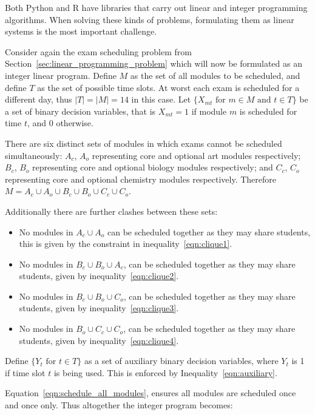 Both Python and R have libraries that carry out linear and integer
programming algorithms. When solving these kinds of problems, formulating
them as linear systems is the most important challenge.

Consider again the exam scheduling problem from
Section~\ref{sec:linear_programming_problem} which
will now be formulated as an integer linear program.
Define \(M\) as the set of all modules to be scheduled, and define \(T\) as the set
of possible time slots. At worst each exam is
scheduled for a different day, thus \(|T| = |M| = 14\) in this case.
Let \(\{X_{mt} \text{ for } m \in M \text{ and } t \in T\}\) be a set of binary
decision variables, that is \(X_{mt} = 1\) if module \(m\) is scheduled for time
\(t\), and \(0\) otherwise.

There are six distinct sets of modules in which exams cannot be scheduled
simultaneously: \(A_c\), \(A_o\) representing core and optional art modules
respectively; \(B_c\), \(B_o\) representing core and optional biology modules
respectively; and \(C_c\), \(C_o\) representing core and optional chemistry modules
respectively.
Therefore \(M = A_c \cup A_o \cup B_c \cup B_o \cup C_c \cup C_o\).

Additionally there are further clashes between these sets:
\begin{itemize}
  \item No modules in \(A_c \cup A_o\) can be scheduled together as they may
  share students, this is given by the constraint in inequality~\ref{eqn:clique1}.
  \item No modules in \(B_c \cup B_o \cup A_c\), can be scheduled together as
  they may share students, given by inequality~\ref{eqn:clique2}.
  \item No modules in \(B_c \cup B_o \cup C_o\), can be scheduled together as
  they may share students, given by inequality~\ref{eqn:clique3}.
  \item No modules in \(B_o \cup C_c \cup C_o\), can be scheduled together as
  they may share students, given by inequality~\ref{eqn:clique4}.
\end{itemize}

Define \(\{Y_t \text{ for } t \in T\}\) as a set of auxiliary binary
decision variables, where \(Y_t\) is 1 if time slot \(t\) is being used. This is
enforced by Inequality~\ref{eqn:auxiliary}.

Equation~\ref{eqn:schedule_all_modules},
ensures all modules are scheduled once and once only.
Thus altogether the integer program becomes:


